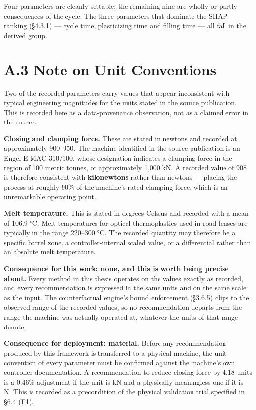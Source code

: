 Four parameters are cleanly settable; the remaining nine are wholly or partly consequences of the cycle. The three parameters that dominate the SHAP ranking (§4.3.1) --- cycle time, plasticizing time and filling time --- all fall in the derived group.

\hypertarget{a.3-note-on-unit-conventions}{%
\section{A.3 Note on Unit Conventions}\label{a.3-note-on-unit-conventions}}

Two of the recorded parameters carry values that appear inconsistent with typical engineering magnitudes for the units stated in the source publication. This is recorded here as a data-provenance observation, not as a claimed error in the source.

\textbf{Closing and clamping force.} These are stated in newtons and recorded at approximately 900--950. The machine identified in the source publication is an Engel E-MAC 310/100, whose designation indicates a clamping force in the region of 100 metric tonnes, or approximately 1,000 kN. A recorded value of 908 is therefore consistent with \textbf{kilonewtons} rather than newtons --- placing the process at roughly 90\% of the machine's rated clamping force, which is an unremarkable operating point.

\textbf{Melt temperature.} This is stated in degrees Celsius and recorded with a mean of 106.9 °C. Melt temperatures for optical thermoplastics used in road lenses are typically in the range 220--300 °C. The recorded quantity may therefore be a specific barrel zone, a controller-internal scaled value, or a differential rather than an absolute melt temperature.

\textbf{Consequence for this work: none, and this is worth being precise about.} Every method in this thesis operates on the values exactly as recorded, and every recommendation is expressed in the same units and on the same scale as the input. The counterfactual engine's bound enforcement (§3.6.5) clips to the observed range of the recorded values, so no recommendation departs from the range the machine was actually operated at, whatever the units of that range denote.

\textbf{Consequence for deployment: material.} Before any recommendation produced by this framework is transferred to a physical machine, the unit convention of every parameter must be confirmed against the machine's own controller documentation. A recommendation to reduce closing force by 4.18 units is a 0.46\% adjustment if the unit is kN and a physically meaningless one if it is N. This is recorded as a precondition of the physical validation trial specified in §6.4 (F1).

